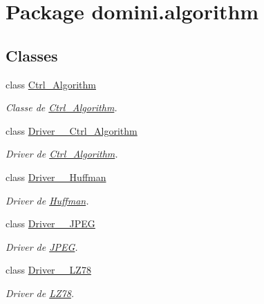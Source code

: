 \hypertarget{namespacedomini_1_1algorithm}{}\section{Package domini.\+algorithm}
\label{namespacedomini_1_1algorithm}
\subsection*{Classes}
\begin{DoxyCompactItemize}
\item 
class \hyperlink{classdomini_1_1algorithm_1_1Ctrl__Algorithm}{Ctrl\+\_\+\+Algorithm}
\begin{DoxyCompactList}\small\item\em Classe de \hyperlink{classdomini_1_1algorithm_1_1Ctrl__Algorithm}{Ctrl\+\_\+\+Algorithm}. \end{DoxyCompactList}\item 
class \hyperlink{classdomini_1_1algorithm_1_1Driver____Ctrl__Algorithm}{Driver\+\_\+\+\_\+\+Ctrl\+\_\+\+Algorithm}
\begin{DoxyCompactList}\small\item\em Driver de \hyperlink{classdomini_1_1algorithm_1_1Ctrl__Algorithm}{Ctrl\+\_\+\+Algorithm}. \end{DoxyCompactList}\item 
class \hyperlink{classdomini_1_1algorithm_1_1Driver____Huffman}{Driver\+\_\+\+\_\+\+Huffman}
\begin{DoxyCompactList}\small\item\em Driver de \hyperlink{classdomini_1_1algorithm_1_1Huffman}{Huffman}. \end{DoxyCompactList}\item 
class \hyperlink{classdomini_1_1algorithm_1_1Driver____JPEG}{Driver\+\_\+\+\_\+\+J\+P\+EG}
\begin{DoxyCompactList}\small\item\em Driver de \hyperlink{classdomini_1_1algorithm_1_1JPEG}{J\+P\+EG}. \end{DoxyCompactList}\item 
class \hyperlink{classdomini_1_1algorithm_1_1Driver____LZ78}{Driver\+\_\+\+\_\+\+L\+Z78}
\begin{DoxyCompactList}\small\item\em Driver de \hyperlink{classdomini_1_1algorithm_1_1LZ78}{L\+Z78}. \end{DoxyCompactList}\item 

\end{DoxyCompactItemize}
